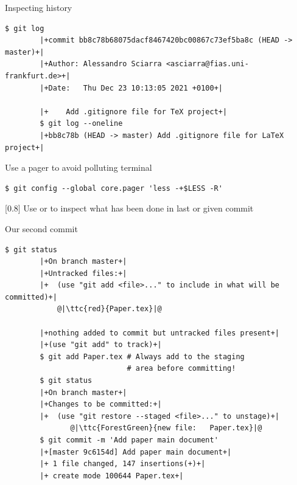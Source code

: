 \documentclass[usenames,svgnames,14pt]{beamer}
\newcommand{\ttc}[2]{\texttt{\textcolor{#1}{#2}}}
\begin{document}
\begin{frame}[fragile]{Inspecting history}
    \begin{lstlisting}[style=MyBash, belowskip=-4mm]
        $ git log
        |+commit bb8c78b68075dacf8467420bc00867c73ef5ba8c (HEAD -> master)+|
        |+Author: Alessandro Sciarra <asciarra@fias.uni-frankfurt.de>+|
        |+Date:   Thu Dec 23 10:13:05 2021 +0100+|

        |+    Add .gitignore file for TeX project+|
        $ git log --oneline
        |+bb8c78b (HEAD -> master) Add .gitignore file for LaTeX project+|
    \end{lstlisting}
    \centerline{Use a pager to avoid polluting terminal}
    \begin{lstlisting}[style=MyBash, aboveskip=2mm]
        $ git config --global core.pager 'less -+$LESS -R'
    \end{lstlisting}
    \medskip
    \begin{varblock}{}[0.8\textwidth]{}
        Use \;\; or \;\; to inspect what has been done in last or given commit
    \end{varblock}
\end{frame}
\begin{frame}[fragile]{Our second commit}
    \begin{lstlisting}[style=MyBash]
        $ git status
        |+On branch master+|
        |+Untracked files:+|
        |+  (use "git add <file>..." to include in what will be committed)+|
            @|\ttc{red}{Paper.tex}|@

        |+nothing added to commit but untracked files present+|
        |+(use "git add" to track)+|
        $ git add Paper.tex # Always add to the staging
                            # area before committing!
        $ git status
        |+On branch master+|
        |+Changes to be committed:+|
        |+  (use "git restore --staged <file>..." to unstage)+|
               @|\ttc{ForestGreen}{new file:   Paper.tex}|@
        $ git commit -m 'Add paper main document'
        |+[master 9c6154d] Add paper main document+|
        |+ 1 file changed, 147 insertions(+)+|
        |+ create mode 100644 Paper.tex+|
    \end{lstlisting}
\end{frame}
\end{document}
